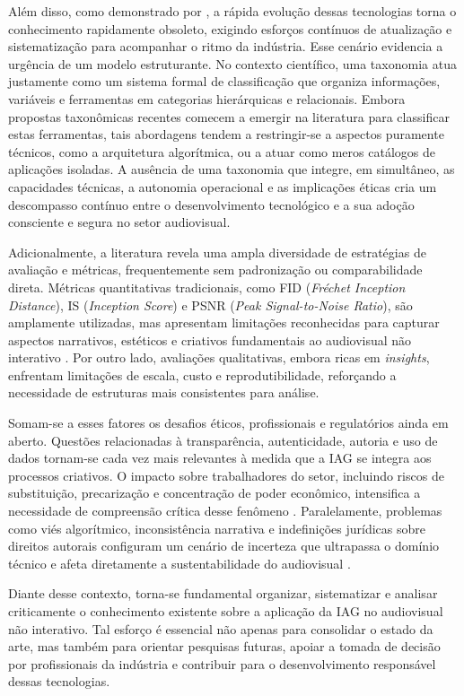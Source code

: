 Além disso, como demonstrado por \citet{RothAleo2026}, a rápida evolução dessas tecnologias torna o conhecimento rapidamente obsoleto, exigindo esforços contínuos de atualização e sistematização para acompanhar o ritmo da indústria. Esse cenário evidencia a urgência de um modelo estruturante. No contexto científico, uma taxonomia atua justamente como um sistema formal de classificação que organiza informações, variáveis e ferramentas em categorias hierárquicas e relacionais. Embora propostas taxonômicas recentes comecem a emergir na literatura para classificar estas ferramentas, tais abordagens tendem a restringir-se a aspectos puramente técnicos, como a arquitetura algorítmica, ou a atuar como meros catálogos de aplicações isoladas. A ausência de uma taxonomia que integre, em simultâneo, as capacidades técnicas, a autonomia operacional e as implicações éticas cria um descompasso contínuo entre o desenvolvimento tecnológico e a sua adoção consciente e segura no setor audiovisual.

Adicionalmente, a literatura revela uma ampla diversidade de estratégias de avaliação e métricas, frequentemente sem padronização ou comparabilidade direta. Métricas quantitativas tradicionais, como FID (\textit{Fréchet Inception Distance}), IS (\textit{Inception Score}) e PSNR (\textit{Peak Signal-to-Noise Ratio}), são amplamente utilizadas, mas apresentam limitações reconhecidas para capturar aspectos narrativos, estéticos e criativos fundamentais ao audiovisual não interativo \citep{karras2020analyzing}. Por outro lado, avaliações qualitativas, embora ricas em \textit{insights}, enfrentam limitações de escala, custo e reprodutibilidade, reforçando a necessidade de estruturas mais consistentes para análise.

Somam-se a esses fatores os desafios éticos, profissionais e regulatórios ainda em aberto. Questões relacionadas à transparência, autenticidade, autoria e uso de dados tornam-se cada vez mais relevantes à medida que a IAG se integra aos processos criativos. O impacto sobre trabalhadores do setor, incluindo riscos de substituição, precarização e concentração de poder econômico, intensifica a necessidade de compreensão crítica desse fenômeno \citep{capraro2024impact}. Paralelamente, problemas como viés algorítmico, inconsistência narrativa e indefinições jurídicas sobre direitos autorais configuram um cenário de incerteza que ultrapassa o domínio técnico e afeta diretamente a sustentabilidade do audiovisual \citep{floridi2020gpt3}.

Diante desse contexto, torna-se fundamental organizar, sistematizar e analisar criticamente o conhecimento existente sobre a aplicação da IAG no audiovisual não interativo. Tal esforço é essencial não apenas para consolidar o estado da arte, mas também para orientar pesquisas futuras, apoiar a tomada de decisão por profissionais da indústria e contribuir para o desenvolvimento responsável dessas tecnologias.

